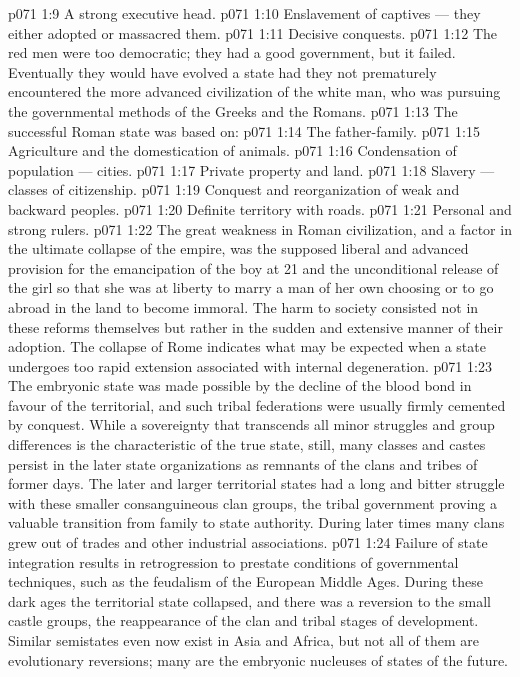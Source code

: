 \vs p071 1:9 \bibnobreakspace A strong executive head.
\vs p071 1:10 \bibnobreakspace Enslavement of captives --- they either adopted or massacred them.
\vs p071 1:11 \bibnobreakspace Decisive conquests.
\vs p071 1:12 \pc The red men were too democratic; they had a good government, but it failed. Eventually they would have evolved a state had they not prematurely encountered the more advanced civilization of the white man, who was pursuing the governmental methods of the Greeks and the Romans.
\vs p071 1:13 \pc The successful Roman state was based on:
\vs p071 1:14 \bibnobreakspace The father\hyp{}family.
\vs p071 1:15 \bibnobreakspace Agriculture and the domestication of animals.
\vs p071 1:16 \bibnobreakspace Condensation of population --- cities.
\vs p071 1:17 \bibnobreakspace Private property and land.
\vs p071 1:18 \bibnobreakspace Slavery --- classes of citizenship.
\vs p071 1:19 \bibnobreakspace Conquest and reorganization of weak and backward peoples.
\vs p071 1:20 \bibnobreakspace Definite territory with roads.
\vs p071 1:21 \bibnobreakspace Personal and strong rulers.
\vs p071 1:22 \pc The great weakness in Roman civilization, and a factor in the ultimate collapse of the empire, was the supposed liberal and advanced provision for the emancipation of the boy at 21 and the unconditional release of the girl so that she was at liberty to marry a man of her own choosing or to go abroad in the land to become immoral. The harm to society consisted not in these reforms themselves but rather in the sudden and extensive manner of their adoption. The collapse of Rome indicates what may be expected when a state undergoes too rapid extension associated with internal degeneration.
\vs p071 1:23 \pc The embryonic state was made possible by the decline of the blood bond in favour of the territorial, and such tribal federations were usually firmly cemented by conquest. While a sovereignty that transcends all minor struggles and group differences is the characteristic of the true state, still, many classes and castes persist in the later state organizations as remnants of the clans and tribes of former days. The later and larger territorial states had a long and bitter struggle with these smaller consanguineous clan groups, the tribal government proving a valuable transition from family to state authority. During later times many clans grew out of trades and other industrial associations.
\vs p071 1:24 Failure of state integration results in retrogression to prestate conditions of governmental techniques, such as the feudalism of the European Middle Ages. During these dark ages the territorial state collapsed, and there was a reversion to the small castle groups, the reappearance of the clan and tribal stages of development. Similar semistates even now exist in Asia and Africa, but not all of them are evolutionary reversions; many are the embryonic nucleuses of states of the future.
